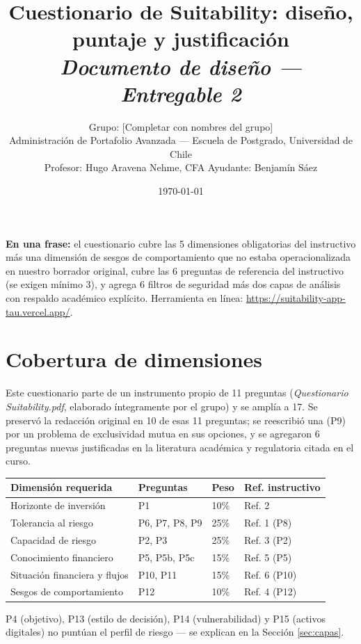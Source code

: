 \documentclass[11pt]{article}
\title{\Large\textbf{Cuestionario de Suitability: diseño, puntaje y justificación}\\[4pt]
\large\textit{Documento de diseño --- Entregable 2}}
\author{Grupo: [Completar con nombres del grupo] \\ Administración de Portafolio Avanzada --- Escuela de Postgrado, Universidad de Chile \\ Profesor: Hugo Aravena Nehme, CFA \quad Ayudante: Benjamín Sáez}
\date{\today}
\begin{document}
\maketitle
\thispagestyle{empty}

\begin{callout}
\textbf{En una frase:} el cuestionario cubre las 5 dimensiones obligatorias del instructivo más una dimensión de sesgos de comportamiento que no estaba operacionalizada en nuestro borrador original, cubre las 6 preguntas de referencia del instructivo (se exigen mínimo 3), y agrega 6 filtros de seguridad más dos capas de análisis con respaldo académico explícito. Herramienta en línea: \url{https://suitability-app-tau.vercel.app/}.
\end{callout}

\section{Cobertura de dimensiones}

Este cuestionario parte de un instrumento propio de 11 preguntas (\textit{Questionario Suitability.pdf}, elaborado íntegramente por el grupo) y se amplía a 17. Se preservó la redacción original en 10 de esas 11 preguntas; se reescribió una (P9) por un problema de exclusividad mutua en sus opciones, y se agregaron 6 preguntas nuevas justificadas en la literatura académica y regulatoria citada en el curso.

\begin{center}
\renewcommand{\arraystretch}{1.3}
\begin{tabular}{@{}p{4.8cm}p{2.5cm}p{2cm}p{4cm}@{}}
\toprule
\textbf{Dimensión requerida} & \textbf{Preguntas} & \textbf{Peso} & \textbf{Ref. instructivo} \\
\midrule
Horizonte de inversión & P1 & 10\% & Ref. 2 \\
Tolerancia al riesgo & P6, P7, P8, P9 & 25\% & Ref. 1 (P8) \\
Capacidad de riesgo & P2, P3 & 25\% & Ref. 3 (P2) \\
Conocimiento financiero & P5, P5b, P5c & 15\% & Ref. 5 (P5) \\
Situación financiera y flujos & P10, P11 & 15\% & Ref. 6 (P10) \\
Sesgos de comportamiento & P12 & 10\% & Ref. 4 (P12) \\
\bottomrule
\end{tabular}
\end{center}

P4 (objetivo), P13 (estilo de decisión), P14 (vulnerabilidad) y P15 (activos digitales) no puntúan el perfil de riesgo --- se explican en la Sección \ref{sec:capas}.
\end{document}
